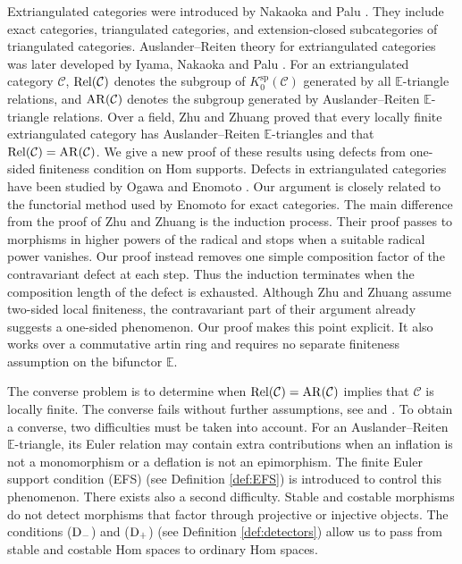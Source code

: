 \documentclass[11pt, twoside]{article}
\def\C{\mathcal{C}}
\def\E{\mathbb{E}}
\numberwithin{equation}{section}
\begin{document}
Extriangulated categories were introduced by Nakaoka and Palu \cite{NakaokaPalu2019}. They include exact categories, triangulated categories, and extension-closed  subcategories of triangulated categories. Auslander--Reiten theory for extriangulated categories was later developed by Iyama, Nakaoka and Palu \cite{IyamaNakaokaPalu2024}. For an extriangulated category $\C$, $\Rel(\C)$ denotes the subgroup of $K_0^{\mathrm{sp}}(\C)$ generated by all $\E$-triangle relations, and $\AR(\C)$ denotes the subgroup generated by Auslander--Reiten $\E$-triangle relations.
Over a field, Zhu and Zhuang \cite[Theorems~3.12 and~4.4]{ZhuZhuang2021} proved that every locally finite extriangulated category has Auslander--Reiten $\E$-triangles and that $\Rel(\C)=\AR(\C)$.
We give a new proof of these results using defects from one-sided finiteness condition on
Hom supports.
Defects in extriangulated categories have been studied by Ogawa \cite{Ogawa2021} and Enomoto \cite{Enomoto2021}. Our argument is closely related to the functorial method used by Enomoto \cite{Enomoto2019} for exact categories. The main difference from the proof of Zhu and Zhuang is the induction process. Their proof passes to morphisms in higher powers of the radical and stops when a suitable radical power vanishes. Our proof instead removes one simple composition factor of the contravariant defect at each step. Thus the induction terminates when the composition length of the defect is exhausted.
Although Zhu and Zhuang \cite[Theorem~4.4]{ZhuZhuang2021} assume two-sided local finiteness, the contravariant part of their argument already suggests a one-sided phenomenon. Our proof makes this point explicit. It also works over a commutative artin ring and requires no separate finiteness assumption on the bifunctor $\E$.

 The converse problem is to determine when
$\Rel(\C)=\AR(\C)$ implies that $\C$ is locally finite.
The converse fails without further assumptions, see \cite[Remark~2]{MarcosMerklenPlatzeck2000} and \cite[Example~4.5(4)]{ZhuZhuang2021}.
To obtain a converse, two difficulties must be taken into account. For an Auslander--Reiten $\E$-triangle, its Euler relation may contain extra contributions when an inflation is not a monomorphism or a deflation is not an epimorphism. The finite Euler support condition (EFS) (see Definition \ref{def:EFS}) is introduced to control this phenomenon. There exists also a second difficulty. Stable and costable morphisms do not detect morphisms that factor through projective or injective objects. The conditions (${\rm D}_-$) and
(${\rm D}_+$) (see Definition \ref{def:detectors}) allow us to pass from stable and costable Hom spaces to ordinary Hom spaces.
\end{document}
